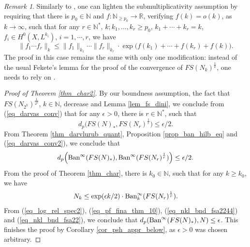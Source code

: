 \documentclass[12pt]{article}
\numberwithin{equation}{section}
\theoremstyle{theorem}
\theoremstyle{definition}
\theoremstyle{remark}
\newtheorem{rem}[thm]{Remark}
\newcommand{\real}{\mathbb{R}}
\newcommand{\nat}{\mathbb{N}}
\begin{document}
	\begin{rem}

		Similarly to \cite[Definition 1.3]{FinSecRing}, one can lighten the submultiplicativity assumption by requiring that there is $p_0 \in \nat$ and $f : \nat_{\geq p_0} \to \real$, verifying $f(k) = o(k)$, as $k \to \infty$, such that for any $r \in \nat^*$, $k; k_1, \ldots, k_r \geq p_0$, $k_1 + \cdots + k_r = k$, $f_i \in H^0(X, L^{k_i})$, $i = 1, \cdots, r$, we have
		\begin{equation}\label{eq_mult_gen}
			\| f_1 \cdots f_r \|_{k} \leq 
			\| f_1 \|_{k_1} \cdots \| f_r \|_{k_r}
			 \cdot
			 \exp \Big(
			 f(k_1) + \cdots + f(k_r) + f(k)
			 \Big).
		\end{equation}
		The proof in this case remains the same with only one modification: instead of the usual Fekete's lemma for the proof of the convergence of $FS(N_k)^{\frac{1}{k}}$, one needs to rely on \cite[Appendix A]{FinSecRing}.	
	\end{rem}
	\begin{proof}[Proof of Theorem \ref{thm_char2}]
		By our boundness assumption, the fact that $FS(N_{2^k})^{\frac{1}{2^k}}$, $k \in \nat$, decrease and Lemma \ref{lem_fs_dini}, we conclude from (\ref{eq_darvas_conv}) that for any $\epsilon > 0$, there is $r \in \nat^*$, such that
		\begin{equation}\label{eq_darvas_conv2}
			d_p \Big( FS(N)_*, FS(N_r)^{\frac{1}{r}} \Big) \leq \epsilon / 2.
		\end{equation}
		From Theorem \ref{thm_darvlurub_quant}, Proposition \ref{prop_ban_hilb_eq} and (\ref{eq_darvas_conv2}), we conclude that 
		\begin{equation}\label{eq_nkl_bnd_fsa2244}
			d_p \Big( {\rm{Ban}}^{\infty}(FS(N)_*), {\rm{Ban}}^{\infty}(FS(N_r)^{\frac{1}{r}}) \Big) \leq \epsilon / 2.
		\end{equation}
		From the proof of Theorem \ref{thm_char}, there is $k_0 \in \nat$, such that for any $k \geq k_0$, we have
		\begin{equation}\label{eq_nkl_bnd_fsa22}
			N_k \leq \exp(\epsilon k / 2) \cdot {\rm{Ban}}^{\infty}_{k}(FS(N_r)^{\frac{1}{r}}).
		\end{equation}
		From (\ref{eq_log_rel_spec2}), (\ref{eq_pf_fina_thm_10}), (\ref{eq_nkl_bnd_fsa2244}) and (\ref{eq_nkl_bnd_fsa22}), we conclude that  $d_p({\rm{Ban}}^{\infty}(FS(N)_*), N) \leq \epsilon$. 
		This finishes the proof by Corollary \ref{cor_psh_appr_below}, as $\epsilon > 0$ was chosen arbitrary.
	\end{proof}
\end{document}
